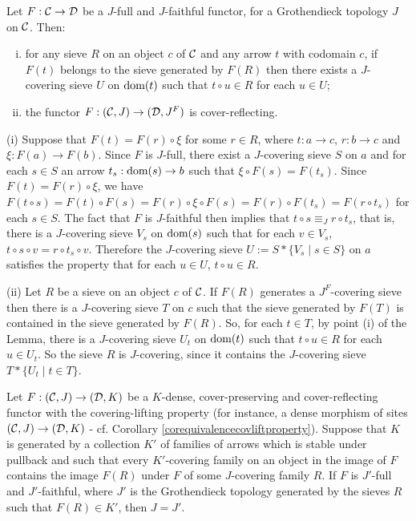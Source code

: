 \documentclass[a4paper,12pt]{article}
\begin{document}
\begin{lemma}\label{lemmafullfaithfulcoverreflecting}
Let $F:{\cal C}\to {\cal D}$ be a $J$-full and $J$-faithful functor, for a Grothendieck topology $J$ on $\cal C$. Then:
\begin{enumerate}[(i)]
	\item for any sieve $R$ on an object $c$ of $\cal C$ and any arrow $t$ with codomain $c$, if $F(t)$ belongs to the sieve generated by $F(R)$ then there exists a $J$-covering sieve $U$ on $\textup{dom}(t)$ such that $t\circ u\in R$ for each $u\in U$;  
	
	\item the functor $F:({\cal C}, J)\to ({\cal D}, J^{F})$ is cover-reflecting.
\end{enumerate}
\end{lemma}

\begin{proofs}
(i) Suppose that $F(t)=F(r)\circ \xi$ for some $r\in R$, where $t:a\to c$, $r:b\to c$ and $\xi:F(a)\to F(b)$. Since $F$ is $J$-full, there exist a $J$-covering sieve $S$ on $a$ and for each $s\in S$ an arrow $t_{s}:\textup{dom}(s)\to b$ such that $\xi \circ F(s)=F(t_{s})$. Since $F(t)=F(r)\circ \xi$, we have $F(t\circ s)=F(t)\circ F(s)=F(r)\circ \xi \circ F(s)= F(r)\circ F(t_{s})=F(r\circ t_{s})$ for each $s\in S$. The fact that $F$ is $J$-faithful then implies that $t\circ s\equiv_{J} r\circ t_{s}$, that is, there is a $J$-covering sieve $V_{s}$ on $\textup{dom}(s)$ such that for each $v\in V_{s}$, $t\circ s\circ v=r\circ t_{s}\circ v$. Therefore the $J$-covering sieve $U:=S\ast \{V_{s} \mid s\in S\}$ on $a$ satisfies the property that for each $u\in U$, $t\circ u\in R$. 

(ii) Let $R$ be a sieve on an object $c$ of $\cal C$. If $F(R)$ generates a $J^{F}$-covering sieve then there is a $J$-covering sieve $T$ on $c$ such that the sieve generated by $F(T)$ is contained in the sieve generated by $F(R)$. So, for each $t\in T$, by point (i) of the Lemma, there is a $J$-covering sieve $U_{t}$ on $\textup{dom}(t)$ such that $t\circ u\in R$ for each $u\in U_{t}$. So the sieve $R$ is $J$-covering, since it contains the $J$-covering sieve $T\ast \{U_{t} \mid t\in T\}$.  	
\end{proofs}

\begin{theorem}\label{corliftinggeneration}
Let $F:({\cal C}, J)\to ({\cal D}, K)$ be a $K$-dense, cover-preserving and cover-reflecting functor with the covering-lifting property (for instance, a dense morphism of sites $({\cal C}, J)\to ({\cal D}, K)$ - cf. Corollary \ref{corequivalencecovliftproperty}). Suppose that $K$ is generated by a collection $K'$ of families of arrows which is stable under pullback and such that every $K'$-covering family on an object in the image of $F$ contains the image $F(R)$ under $F$ of some $J$-covering family $R$. If $F$ is $J'$-full and $J'$-faithful, where $J'$ is the Grothendieck topology generated by the sieves $R$ such that $F(R)\in K'$, then $J=J'$.	
\end{theorem}
\end{document}
